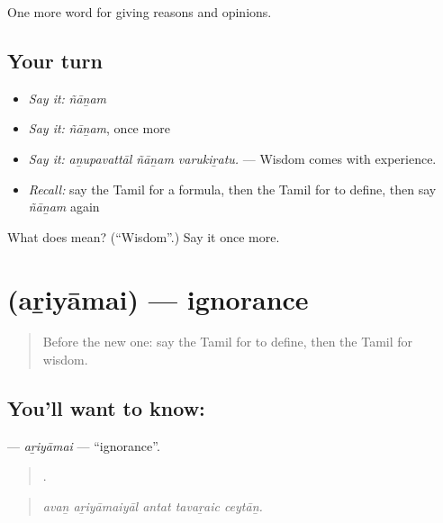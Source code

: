 \begin{grammarlens}[title={What you've built}]
One more word for giving reasons and opinions.
\end{grammarlens}

\subsection*{Your turn}
\begin{itemize}
\raggedright
  \item \emph{Say it:} \emph{ñāṉam}
  \item \emph{Say it:} \emph{ñāṉam}, once more
  \item \emph{Say it:} \emph{aṉupavattāl ñāṉam varukiṟatu.} — Wisdom comes with experience.
  \item \emph{Recall:} say the Tamil for a formula, then the Tamil for to define, then say \emph{ñāṉam} again
\end{itemize}

\begin{tcolorbox}[breakable,colback=teal!4,colframe=teal!35!black,title={Before you move on}]
What does  mean? (\textquotedblleft{}Wisdom\textquotedblright{}.) Say it once more.
\end{tcolorbox}
\section[\texorpdfstring{\ta{அறியாமை} (aṟiyāmai)}{அறியாமை (aṟiyāmai)}]{ (aṟiyāmai) — ignorance}

\label{lesson:TA-C367-ariyamai}



\begin{quote}
Before the new one: say the Tamil for to define, then the Tamil for wisdom.
\end{quote}

\subsection*{You'll want to know: }
\textbf{} — \emph{aṟiyāmai} — \textquotedblleft{}ignorance\textquotedblright{}.

\begin{quote}
    .
\end{quote}

\begin{quote}
\emph{avaṉ aṟiyāmaiyāl antat tavaṟaic ceytāṉ.}
\end{quote}

